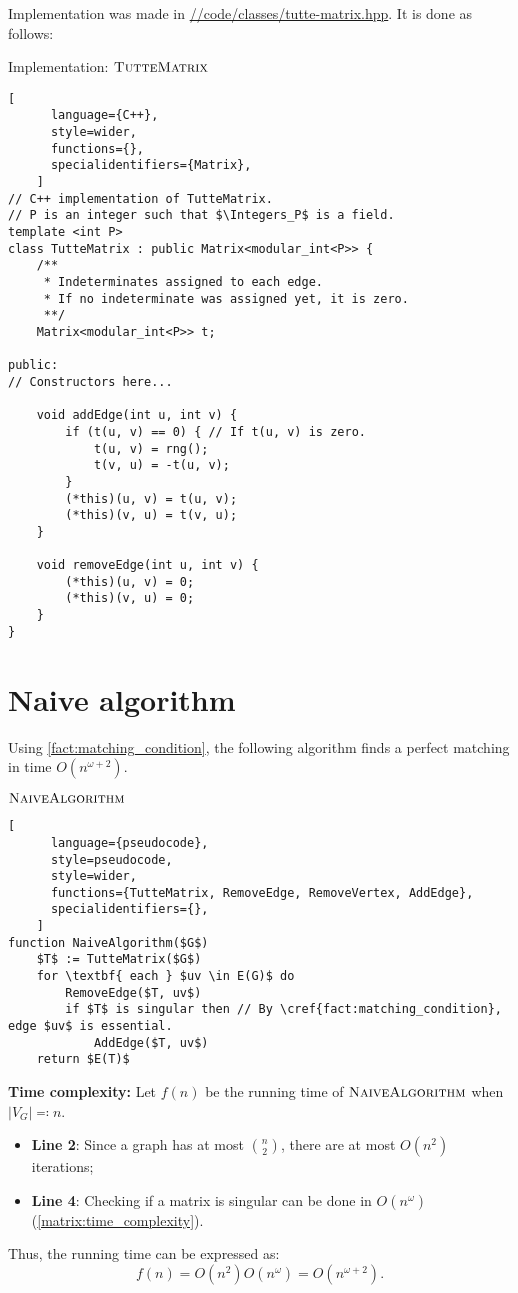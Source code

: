 Implementation was made in \href{https://github.com/antoniomsah/algebraic-max-matching/blob/main/code/classes/tutte-matrix.hpp}{//code/classes/tutte-matrix.hpp}.
It is done as follows:
\begin{programruledcaption}{Implementation: \(\textsc{TutteMatrix}\)}
    \begin{lstlisting}[
      language={C++},
      style=wider,
      functions={},
      specialidentifiers={Matrix},
    ]
// C++ implementation of TutteMatrix.
// P is an integer such that $\Integers_P$ is a field.
template <int P>
class TutteMatrix : public Matrix<modular_int<P>> {
    /** 
     * Indeterminates assigned to each edge.
     * If no indeterminate was assigned yet, it is zero.
     **/ 
    Matrix<modular_int<P>> t; 
    
public:
// Constructors here...

    void addEdge(int u, int v) {
        if (t(u, v) == 0) { // If t(u, v) is zero.
            t(u, v) = rng();
            t(v, u) = -t(u, v);
        }
        (*this)(u, v) = t(u, v);
        (*this)(v, u) = t(v, u);
    }

    void removeEdge(int u, int v) {
        (*this)(u, v) = 0;
        (*this)(v, u) = 0;
    }
}
    \end{lstlisting}
\end{programruledcaption}

\newpage
\section{Naive algorithm}


Using \cref{fact:matching_condition}, the following algorithm finds a perfect matching in time \(O(n^{\omega+2})\).
\begin{programruledcaption}{\(\textsc{NaiveAlgorithm}\)}
    \label{alg:simple}
    \begin{lstlisting}[
      language={pseudocode},
      style=pseudocode,
      style=wider,
      functions={TutteMatrix, RemoveEdge, RemoveVertex, AddEdge},
      specialidentifiers={},
    ]
function NaiveAlgorithm($G$)
    $T$ := TutteMatrix($G$)
    for \textbf{ each } $uv \in E(G)$ do
        RemoveEdge($T, uv$)
        if $T$ is singular then // By \cref{fact:matching_condition}, edge $uv$ is essential.
            AddEdge($T, uv$)
    return $E(T)$
    \end{lstlisting}
\end{programruledcaption}
\noindent
\textbf{Time complexity:}
Let \(f(n)\) be the running time of \(\textsc{NaiveAlgorithm}\) when \(|V_G| \eqcolon n\).
\begin{itemize}
    \item \textbf{Line 2}: Since a graph has at most \(\binom{n}{2}\), there are at most \(O(n^2)\) iterations;
    \item \textbf{Line 4}: Checking if a matrix is singular can be done in \(O(n^\omega)\) (\cref{matrix:time_complexity}).
\end{itemize}
Thus, the running time can be expressed as:
\[
    f(n) = O(n^2) O(n^\omega) = O(n^{\omega+2}).
\]

